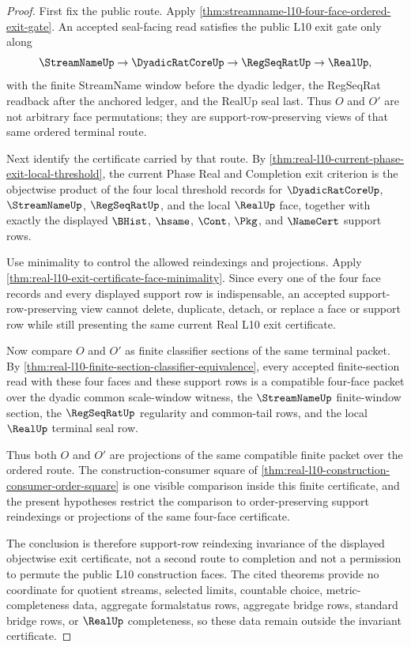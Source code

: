 \begin{proof}
First fix the public route. Apply \autoref{thm:streamname-l10-four-face-ordered-exit-gate}. An accepted seal-facing read satisfies the public L10 exit gate only along
$$
\StreamNameUp \to \DyadicRatCoreUp \to \RegSeqRatUp \to \RealUp,
$$
with the finite StreamName window before the dyadic ledger, the RegSeqRat readback after the anchored ledger, and the RealUp seal last. Thus $O$ and $O'$ are not arbitrary face permutations; they are support-row-preserving views of that same ordered terminal route.

Next identify the certificate carried by that route. By \autoref{thm:real-l10-current-phase-exit-local-threshold}, the current Phase Real and Completion exit criterion is the objectwise product of the four local threshold records for $\DyadicRatCoreUp$, $\StreamNameUp$, $\RegSeqRatUp$, and the local $\RealUp$ face, together with exactly the displayed $\BHist$, $\hsame$, $\Cont$, $\Pkg$, and $\NameCert$ support rows.

Use minimality to control the allowed reindexings and projections. Apply \autoref{thm:real-l10-exit-certificate-face-minimality}. Since every one of the four face records and every displayed support row is indispensable, an accepted support-row-preserving view cannot delete, duplicate, detach, or replace a face or support row while still presenting the same current Real L10 exit certificate.

Now compare $O$ and $O'$ as finite classifier sections of the same terminal packet. By \autoref{thm:real-l10-finite-section-classifier-equivalence}, every accepted finite-section read with these four faces and these support rows is a compatible four-face packet over the dyadic common scale-window witness, the $\StreamNameUp$ finite-window section, the $\RegSeqRatUp$ regularity and common-tail rows, and the local $\RealUp$ terminal seal row.

Thus both $O$ and $O'$ are projections of the same compatible finite packet over the ordered route. The construction-consumer square of \autoref{thm:real-l10-construction-consumer-order-square} is one visible comparison inside this finite certificate, and the present hypotheses restrict the comparison to order-preserving support reindexings or projections of the same four-face certificate.

The conclusion is therefore support-row reindexing invariance of the displayed objectwise exit certificate, not a second route to completion and not a permission to permute the public L10 construction faces. The cited theorems provide no coordinate for quotient streams, selected limits, countable choice, metric-completeness data, aggregate formalstatus rows, aggregate bridge rows, standard bridge rows, or $\RealUp$ completeness, so these data remain outside the invariant certificate.
\end{proof}

